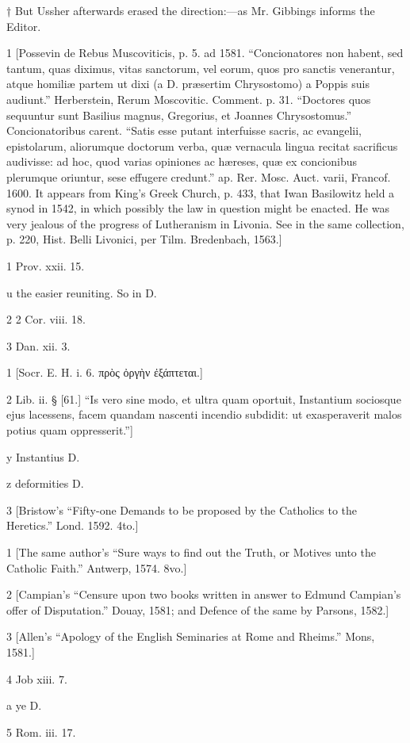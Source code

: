 †
But Ussher afterwards erased the direction:—as Mr. Gibbings informs the Editor.

1
[Possevin de Rebus Muscoviticis, p. 5. ad 1581. “Concionatores non habent, sed tantum, quas diximus, vitas sanctorum, vel eorum, quos pro sanctis venerantur, atque homiliæ partem ut dixi (a D. præsertim Chrysostomo) a Poppis suis audiunt.” Herberstein, Rerum Moscovitic. Comment. p. 31. “Doctores quos sequuntur sunt Basilius magnus, Gregorius, et Joannes Chrysostomus.” Concionatoribus carent. “Satis esse putant interfuisse sacris, ac evangelii, epistolarum, aliorumque doctorum verba, quæ vernacula lingua recitat sacrificus audivisse: ad hoc, quod varias opiniones ac hæreses, quæ ex concionibus plerumque oriuntur, sese effugere credunt.” ap. Rer. Mosc. Auct. varii, Francof. 1600. It appears from King’s Greek Church, p. 433, that Iwan Basilowitz held a synod in 1542, in which possibly the law in question might be enacted. He was very jealous of the progress of Lutheranism in Livonia. See in the same collection, p. 220, Hist. Belli Livonici, per Tilm. Bredenbach, 1563.]

1
Prov. xxii. 15.

u
the easier reuniting. So in D.

2
2 Cor. viii. 18.

3
Dan. xii. 3.

1
[Socr. E. H. i. 6. πρὸς ὀργὴν ἐξάπτεται.]

2
Lib. ii. § [61.] “Is vero sine modo, et ultra quam oportuit, Instantium sociosque ejus lacessens, facem quandam nascenti incendio subdidit: ut exasperaverit malos potius quam oppresserit.”]

y
Instantius D.

z
deformities D.

3
[Bristow’s “Fifty-one Demands to be proposed by the Catholics to the Heretics.” Lond. 1592. 4to.]

1
[The same author’s “Sure ways to find out the Truth, or Motives unto the Catholic Faith.” Antwerp, 1574. 8vo.]

2
[Campian’s “Censure upon two books written in answer to Edmund Campian’s offer of Disputation.” Douay, 1581; and Defence of the same by Parsons, 1582.]

3
[Allen’s “Apology of the English Seminaries at Rome and Rheims.” Mons, 1581.]

4
Job xiii. 7.

a
ye D.

5
Rom. iii. 17.

